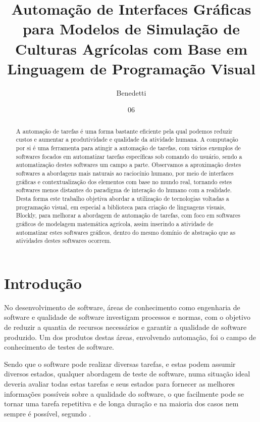 \documentclass[tg]{mdtufsm}
\title{Automação de Interfaces Gráficas para Modelos de Simulação de Culturas Agrícolas com Base em Linguagem de Programação Visual}
\author{Benedetti}{Romulo Pulcinelli}
\institute{Centro de Tecnologia}
\date{06}{Julho}{2016}
\begin{document}
    \maketitle
    \makeapprove

    \begin{abstract}
        A automação de tarefas é uma forma bastante eficiente pela qual podemos reduzir custos e aumentar a produtividade e qualidade da atividade humana. A computação por si é uma ferramenta para atingir a automação de tarefas, com vários exemplos de softwares focados em automatizar tarefas específicas sob comando do usuário, sendo a automatização destes softwares um campo a parte. Observamos a aproximação destes softwares a abordagens mais naturais ao raciocínio humano, por meio de interfaces gráficas e contextualização dos elementos com base no mundo real, tornando estes softwares menos distantes do paradigma de interação do humano com a realidade. Desta forma este trabalho objetiva abordar a utilização de tecnologias voltadas a programação visual, em especial a biblioteca para criação de linguagens visuais, Blockly, para melhorar a abordagem de automação de tarefas, com foco em softwares gráficos de modelagem matemática agrícola, assim inserindo a atividade de automatizar estes softwares gráficos, dentro do mesmo domínio de abstração que as atividades destes softwares ocorrem.
    \end{abstract}

    \tableofcontents

    \setlength{\baselineskip}{1.5\baselineskip}

    \chapter{Introdução}

    	No desenvolvimento de software, áreas de conhecimento como engenharia de software e qualidade de software investigam processos e normas, com o objetivo de reduzir a quantia de recursos necessários e garantir a qualidade de software produzido. Um dos produtos destas áreas, envolvendo automação, foi o campo de conhecimento de testes de software.

        Sendo que o software pode realizar diversas tarefas, e estas podem assumir diversos estados, qualquer abordagem de teste de software, numa situação ideal deveria avaliar todas estas tarefas e seus estados para fornecer as melhores informações possíveis sobre a qualidade do software, o que facilmente pode se tornar uma tarefa repetitiva e de longa duração e na maioria dos casos nem sempre é possível, segundo \cite[pag. 10]{myers2011art}.
\end{document}
